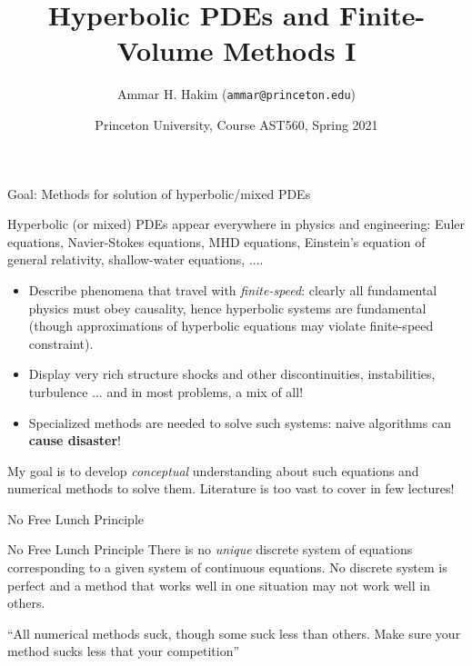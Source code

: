 \documentclass[aspectratio=169]{beamer}
\title[{\tt }]{Hyperbolic PDEs and Finite-Volume Methods I}%
\author[https://ast560.rtfd.io]%
{Ammar H. Hakim ({\tt ammar@princeton.edu}) \inst{1}}%
\institute[PPPL]
{ \inst{1} Princeton Plasma Physics Laboratory, Princeton, NJ %
}
\date[2/9/2021]{Princeton University, Course AST560, Spring 2021}
\newcommand{\mypause}{}
\begin{document}
\begin{frame}[plain]
  \titlepage
\end{frame}

\begin{frame}{Goal: Methods for solution of hyperbolic/mixed PDEs}

  Hyperbolic (or mixed) PDEs appear everywhere in physics and
  engineering: Euler equations, Navier-Stokes equations, MHD
  equations, Einstein's equation of general relativity, shallow-water
  equations, ....%
  \mypause%
  \begin{itemize}
  \item Describe phenomena that travel with \emph{finite-speed}:
    clearly all fundamental physics must obey causality, hence
    hyperbolic systems are fundamental (though approximations of
    hyperbolic equations may violate finite-speed constraint).
    \mypause%
  \item Display very rich structure shocks and other discontinuities,
    instabilities, turbulence ... and in most problems, a mix of all!
    \mypause%
  \item Specialized methods are needed to solve such systems: naive
    algorithms can {\bf cause disaster}!
  \end{itemize}
  \mypause%
  My goal is to develop \emph{conceptual} understanding about such
  equations and numerical methods to solve them. Literature is too
  vast to cover in few lectures!

\end{frame}


\begin{frame}{No Free Lunch Principle}

  \begin{block}{No Free Lunch Principle}
    There is no \emph{unique} discrete system of equations
    corresponding to a given system of continuous equations. No
    discrete system is perfect and a method that works well in one
    situation may not work well in others.
  \end{block}
  \vskip0.1in%
  \mypause%
  ``All numerical methods suck, though some suck less than
  others. Make sure your method sucks less that your competition''
  
\end{frame}

\end{document}
